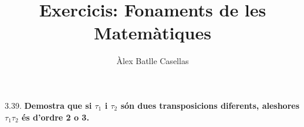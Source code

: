 \documentclass[11pt]{article}
\title{Exercicis: Fonaments de les Matemàtiques}
\author{Àlex Batlle Casellas}
\begin{document}
\begin{legal}
	\item[3.39.] \textbf{Demostra que si $\tau_1$ i $\tau_2$ són dues transposicions diferents, aleshores $\tau_1\tau_2$ és d'ordre 2 o 3.}
\end{legal}
\end{document}
